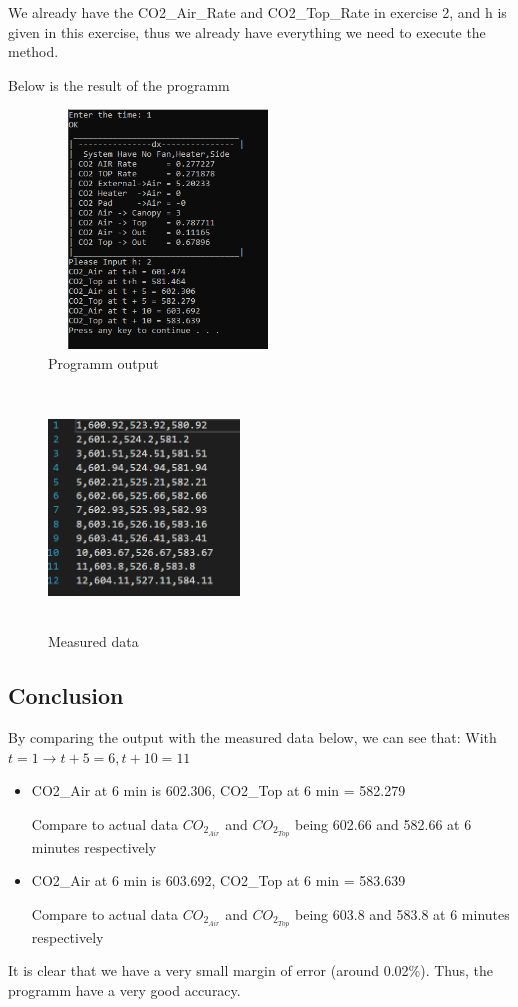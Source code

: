 We already have the CO2\_Air\_Rate and CO2\_Top\_Rate in exercise 2, and h is given in this exercise, thus we already have everything we need to execute the method.

Below is the result of the programm

\begin{figure}[h]
\centering
    \includegraphics[width = 2.5in, height = 2.5in]{Code/Pic/final1.png}
    \caption{Programm output}
    \label{fig:my_label}
\end{figure}

\begin{figure}[h]
\centering
    \includegraphics[width = 2in, height = 2.5in]{Code/Pic/final2.png}
    \caption{Measured data}
    \label{fig:my_label}
\end{figure}
\subsection{Conclusion}
By comparing the output with the measured data below, we can see that: 
With $t=1 \longrightarrow t+5=6, t+10=11$
\begin{itemize}
    \item CO2\_Air at 6 min is 602.306, CO2\_Top at 6 min = 582.279
    
    Compare to 
    actual data $CO_2_{Air}$ and $CO_2_{Top}$ being 602.66 and  582.66 at 6 minutes respectively
    \item CO2\_Air at 6 min is 603.692, CO2\_Top at 6 min = 583.639
    
    Compare to 
    actual data $CO_2_{Air}$ and $CO_2_{Top}$ being 603.8 and  583.8 at 6 minutes respectively
\end{itemize}

It is clear that we have a very small margin of error (around 0.02\%). Thus, the programm have a very good accuracy.











